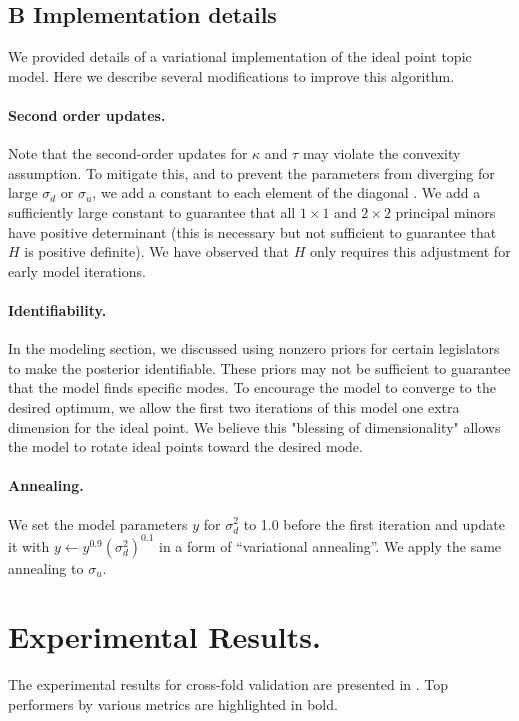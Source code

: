 \subsection*{B \quad Implementation details}

We provided details of a variational implementation of the ideal point
topic model.  Here we describe several modifications to improve this
algorithm.

\paragraph{Second order updates.}  Note that the second-order updates
for $\kappa$ and $\tau$ may violate the convexity assumption.  To
mitigate this, and to prevent the parameters from diverging for large
$\sigma_d$ or $\sigma_u$, we add a constant to each element of the
diagonal \cite{levenberg:1944}.  We add a sufficiently large constant
to guarantee that all $1 \times 1$ and $2 \times 2$ principal minors
have positive determinant (this is necessary but not sufficient to
guarantee that $H$ is positive definite).  We have observed that $H$
only requires this adjustment for early model iterations.

\paragraph{Identifiability.} In the modeling section, we discussed using
nonzero priors for certain legislators to make the posterior
identifiable. These priors may not be sufficient to guarantee that the
model finds specific modes.  To encourage the model to converge to the
desired optimum, we allow the first two iterations of this model one
extra dimension for the ideal point.  We believe this "blessing of
dimensionality" allows the model to rotate ideal points toward the
desired mode.

\paragraph{Annealing.}  We set the model parameters $y$ for
$\sigma_d^2$ to 1.0 before the first iteration and update it with $y
\gets y^{0.9} (\sigma_d^2)^{0.1}$ in a form of ``variational
annealing''.  We apply the same annealing to $\sigma_u$.

\section{Experimental Results.}
The experimental results for cross-fold validation are presented in
.  Top performers by various metrics are
highlighted in bold.

